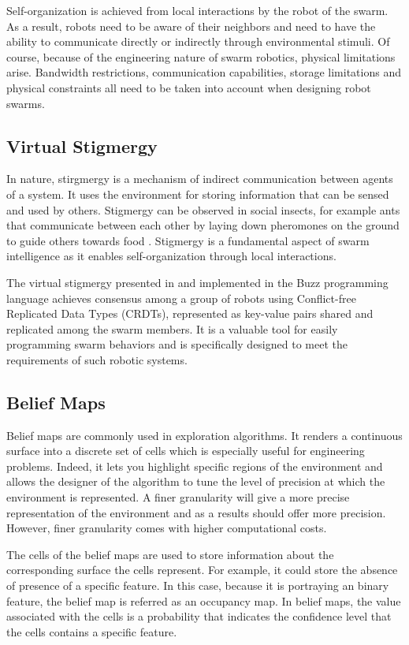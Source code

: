Self-organization is achieved from local interactions by the robot of the swarm. As a result, robots need to be aware of their neighbors and need to have the ability to communicate directly or indirectly through environmental stimuli. Of course, because of the engineering nature of swarm robotics, physical limitations arise. Bandwidth restrictions, communication capabilities, storage limitations and physical constraints all need to be taken into account when designing robot swarms.

\subsection{Virtual Stigmergy}
In nature, stirgmergy is a mechanism of indirect communication between agents of a system. It uses the environment for storing information that can be sensed and used by others. Stigmergy can be observed in social insects, for example ants that communicate between each other by laying down pheromones on the ground to guide others towards food \cite{bonabeau1999swarm}. Stigmergy is a fundamental aspect of swarm intelligence as it enables self-organization through local interactions.

The virtual stigmergy presented in \cite{pinciroliTuple2016} and implemented in the Buzz
programming language \cite{pinciroliBuzz2016} achieves consensus among
a group of robots using Conflict-free Replicated Data Types (CRDTs), represented as key-value pairs shared and replicated among the swarm members.  It is a valuable tool for easily programming swarm behaviors and is specifically designed to meet the requirements of such robotic systems. 

\subsection{Belief Maps}
Belief maps are commonly used in exploration algorithms. It renders a continuous surface into a discrete set of cells which is especially useful for engineering problems. Indeed, it lets you highlight specific regions of the environment and allows the designer of the algorithm to tune the level of precision at which the environment is represented. A finer granularity will give a more precise representation of the environment and as a results should offer more precision. However, finer granularity comes with higher computational costs. 

The cells of the belief maps are used to store information about the corresponding surface the cells represent. For example, it could store the absence of presence of a specific feature. In this case, because it is portraying an binary feature, the belief map is referred as an occupancy map. In belief maps, the value associated with the cells is a probability that indicates the confidence level that the cells contains a specific feature.

